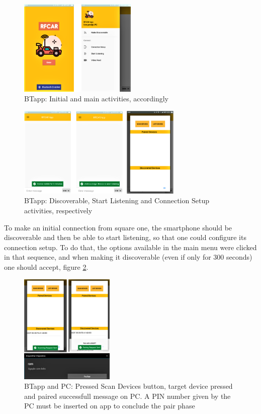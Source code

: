 %
\begin{figure}[!ht]
\centering
\includegraphics[width=0.5\textwidth]{img/bt_intro_main.png}
\caption{\label{fig:bt_intro_main}BTapp: Initial and main activities, accordingly}
\end{figure}
%
\begin{figure}[!ht]
\centering
\includegraphics[width=0.7\textwidth]{img/bt_disc_list_setup.png}
\caption{\label{fig:bt_disc_list_setup}BTapp: Discoverable, Start Listening and Connection Setup activities, respectively}
\end{figure}
%
To make an initial connection from square one, the smartphone should be discoverable and then be able to start listening, so that one could configure its connection setup. To do that, the options available in the main menu were clicked in that sequence, and when making it discoverable (even if only for 300 seconds) one should accept, figure \ref{fig:bt_disc_list_setup}.
%
\begin{figure}[!ht]
\centering
\includegraphics[width=0.4\textwidth]{img/bt_con_scan_pair_suc.png}
\caption{\label{fig:bt_con_scan_pair_suc}BTapp and PC: Pressed Scan Devices button, target device pressed and paired successfull message on PC. A PIN number given by the PC must be inserted on app to conclude the pair phase}
\end{figure}
